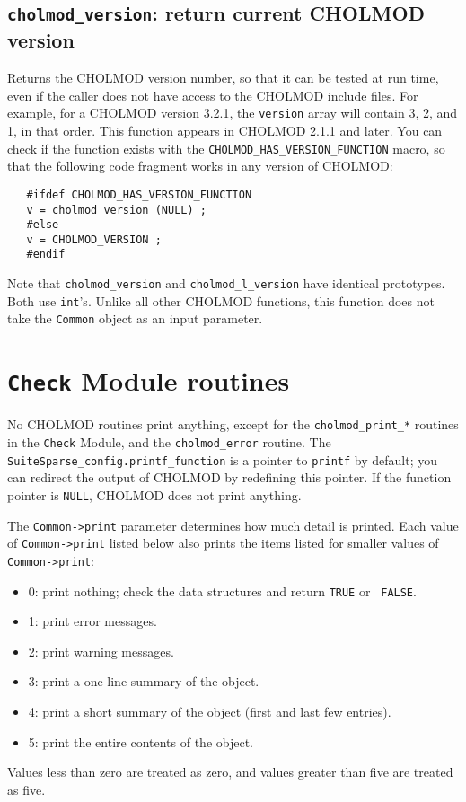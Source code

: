 \documentclass[11pt]{article}
\begin{document}
\subsection{{\tt cholmod\_version}: return current CHOLMOD version}


Returns the CHOLMOD version number, so that it can be tested at run time, even
if the caller does not have access to the CHOLMOD include files.  For example,
for a CHOLMOD version 3.2.1, the {\tt version} array will contain 3, 2, and 1,
in that order.  This function appears in CHOLMOD 2.1.1 and later.  You can
check if the function exists with the {\tt CHOLMOD\_HAS\_VERSION\_FUNCTION}
macro, so that the following code fragment works in any version of CHOLMOD:

\begin{verbatim}
   #ifdef CHOLMOD_HAS_VERSION_FUNCTION
   v = cholmod_version (NULL) ;
   #else
   v = CHOLMOD_VERSION ;
   #endif
\end{verbatim}

Note that {\tt cholmod\_version} and {\tt cholmod\_l\_version} have identical
prototypes.  Both use {\tt int}'s.  Unlike all other CHOLMOD functions, this
function does not take the {\tt Common} object as an input parameter.

\newpage \section{{\tt Check} Module routines}

No CHOLMOD routines print anything, except for the {\tt cholmod\_print\_*}
routines in the {\tt Check} Module, and the {\tt cholmod\_error} routine.  The
{\tt SuiteSparse\_config.printf\_function} is a pointer to {\tt printf} by
default; you can redirect the output of CHOLMOD by redefining this pointer.  If
the function pointer is {\tt NULL}, CHOLMOD does not print anything.

The {\tt Common->print} parameter determines how much detail is printed.  Each
value of {\tt Common->print} listed below also prints the items listed for
smaller values of {\tt Common->print}:

\begin{itemize}
\item 0: print nothing; check the data structures and return {\tt TRUE} or {\tt
FALSE}.
\item 1: print error messages.
\item 2: print warning messages.
\item 3: print a one-line summary of the object.
\item 4: print a short summary of the object (first and last few entries).
\item 5: print the entire contents of the object.
\end{itemize}
Values less than zero are treated as zero, and values greater than five are
treated as five.
\end{document}
